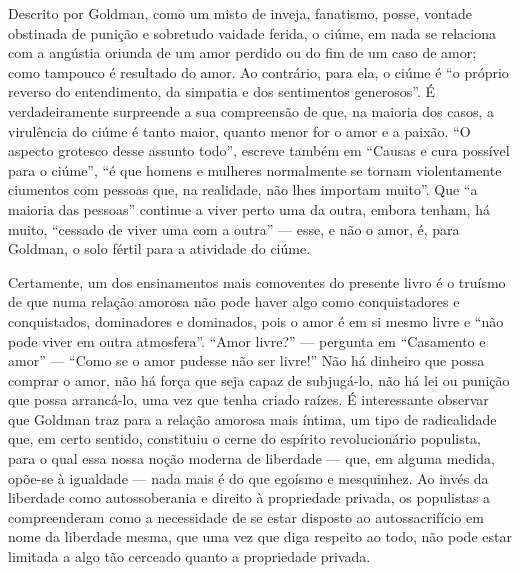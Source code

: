 Descrito por Goldman, como um misto de inveja, fanatismo, posse,
vontade obstinada de punição e sobretudo vaidade ferida, o ciúme, em
nada se relaciona com a angústia oriunda de um amor perdido ou
do fim de um caso de amor; como tampouco é resultado do amor. Ao
contrário, para ela, o ciúme é ``o próprio reverso do entendimento, da
simpatia e dos sentimentos generosos''. É verdadeiramente surpreende a
sua compreensão de que, na maioria dos casos, a virulência do ciúme é
tanto maior, quanto menor for o amor e a paixão. ``O aspecto grotesco
desse assunto todo'', escreve também em ``Causas e cura possível para o
ciúme'', ``é que homens e mulheres normalmente se tornam violentamente
ciumentos com pessoas que, na realidade, não lhes importam muito''. Que
``a maioria das pessoas'' continue a viver perto uma da outra, embora
tenham, há muito, ``cessado de viver uma com a outra'' --- esse, e não o
amor, é, para Goldman, o solo fértil para a atividade do ciúme.

Certamente, um dos ensinamentos mais comoventes do presente livro é o
truísmo de que numa relação amorosa não pode haver algo como
conquistadores e conquistados, dominadores e dominados, pois o amor é em
si mesmo livre e ``não pode viver em outra atmosfera''. ``Amor livre?''
--- pergunta em ``Casamento e amor'' --- ``Como se o amor pudesse não ser
livre!'' Não há dinheiro que possa comprar o amor, não há força que seja
capaz de subjugá-lo, não há lei ou punição que possa arrancá-lo, uma vez
que tenha criado raízes. É interessante observar que Goldman traz para a
relação amorosa mais íntima, um tipo de radicalidade que, em certo
sentido, constituiu o cerne do espírito revolucionário populista, para o
qual essa nossa noção moderna de liberdade --- que, em alguma medida,
opõe-se à igualdade --- nada mais é do que egoísmo e mesquinhez. Ao invés
da liberdade como autossoberania e direito à propriedade privada, os
populistas a compreenderam como a necessidade de se estar disposto ao
autossacrifício em nome da liberdade mesma, que uma vez que diga
respeito ao todo, não pode estar limitada a algo tão cerceado quanto a
propriedade privada. 

